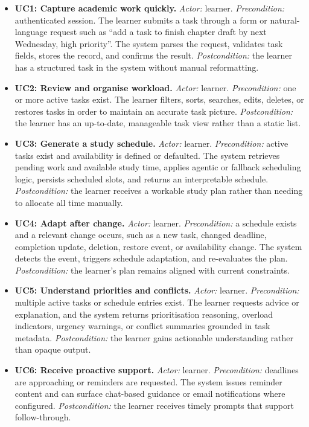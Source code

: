 \documentclass[12pt]{article}
\begin{document}
\begin{itemize}
    \item \textbf{UC1: Capture academic work quickly.} \textit{Actor:} learner. \textit{Precondition:} authenticated session. The learner submits a task through a form or natural-language request such as ``add a task to finish chapter draft by next Wednesday, high priority''. The system parses the request, validates task fields, stores the record, and confirms the result. \textit{Postcondition:} the learner has a structured task in the system without manual reformatting.

    \item \textbf{UC2: Review and organise workload.} \textit{Actor:} learner. \textit{Precondition:} one or more active tasks exist. The learner filters, sorts, searches, edits, deletes, or restores tasks in order to maintain an accurate task picture. \textit{Postcondition:} the learner has an up-to-date, manageable task view rather than a static list.

    \item \textbf{UC3: Generate a study schedule.} \textit{Actor:} learner. \textit{Precondition:} active tasks exist and availability is defined or defaulted. The system retrieves pending work and available study time, applies agentic or fallback scheduling logic, persists scheduled slots, and returns an interpretable schedule. \textit{Postcondition:} the learner receives a workable study plan rather than needing to allocate all time manually.

    \item \textbf{UC4: Adapt after change.} \textit{Actor:} learner. \textit{Precondition:} a schedule exists and a relevant change occurs, such as a new task, changed deadline, completion update, deletion, restore event, or availability change. The system detects the event, triggers schedule adaptation, and re-evaluates the plan. \textit{Postcondition:} the learner's plan remains aligned with current constraints.

    \item \textbf{UC5: Understand priorities and conflicts.} \textit{Actor:} learner. \textit{Precondition:} multiple active tasks or schedule entries exist. The learner requests advice or explanation, and the system returns prioritisation reasoning, overload indicators, urgency warnings, or conflict summaries grounded in task metadata. \textit{Postcondition:} the learner gains actionable understanding rather than opaque output.

    \item \textbf{UC6: Receive proactive support.} \textit{Actor:} learner. \textit{Precondition:} deadlines are approaching or reminders are requested. The system issues reminder content and can surface chat-based guidance or email notifications where configured. \textit{Postcondition:} the learner receives timely prompts that support follow-through.
\end{itemize}
\end{document}
